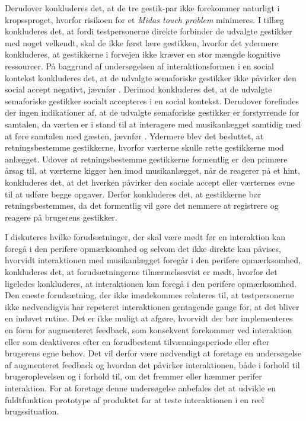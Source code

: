 Derudover konkluderes det, at de tre gestik-par ikke forekommer naturligt i kropssproget, hvorfor risikoen for et \textit{Midas touch problem} minimeres. I tillæg konkluderes det, at fordi testpersonerne direkte forbinder de udvalgte gestikker med noget velkendt, skal de ikke først lære gestikken, hvorfor det ydermere konkluderes, at gestikkerne i forvejen ikke kræver en stor mængde kognitive ressourcer.\blankline 
%
På baggrund af undersøgelsen af interaktionsformen i en social kontekst konkluderes det, at de udvalgte semaforiske gestikker ikke påvirker den social accept negativt, jævnfør . Derimod konkluderes det, at de udvalgte semaforiske gestikker socialt accepteres i en social kontekst. Derudover forefindes der ingen indikationer af, at de udvalgte semaforiske gestikker er forstyrrende for samtalen, da værten er i stand til at interagere med musikanlægget samtidig med at føre samtalen med gæsten, jævnfør . Ydermere blev det besluttet, at retningsbestemme gestikkerne, hvorfor værterne skulle rette gestikkerne mod anlægget. Udover at retningsbestemme gestikkerne formentlig er den primære årsag til, at værterne kigger hen imod musikanlægget, når de reagerer på et hint, konkluderes det, at det hverken påvirker den sociale accept eller værternes evne til at udføre begge opgaver. Derfor konkluderes det, at gestikkerne bør retningsbestemmes, da det formentlig vil gøre det nemmere at registrere og reagere på brugerens gestikker.  

I  diskuteres hvilke forudsætninger, der skal være mødt før en interaktion kan foregå i den perifere opmærksomhed og selvom det ikke direkte kan påvises, hvorvidt interaktionen med musikanlægget foregår i den perifere opmærksomhed, konkluderes det, at forudsætningerne tilnærmelsesvist er mødt, hvorfor det ligeledes konkluderes, at interaktionen kan foregå i den perifere opmærksomhed. Den eneste forudsætning, der ikke imødekommes relateres til, at testpersonerne ikke nødvendigvis har repeteret interaktionen gentagende gange for, at det bliver en indøvet rutine.\blankline
%
Det er ikke muligt at afgøre, hvorvidt der bør implementeres en form for augmenteret feedback, som konsekvent forekommer ved interaktion eller som deaktiveres efter en forudbestemt tilvænningsperiode eller efter brugerens egne behov. Det vil derfor være nødvendigt at foretage en undersøgelse af augmenteret feedback og hvordan det påvirker interaktionen, både i forhold til brugeroplevelsen og i forhold til, om det fremmer eller hæmmer perifer interaktion. For at foretage denne undersøgelse anbefales det at udvikle en fuldtfunktion prototype af produktet for at teste interaktionen i en reel brugssituation.




